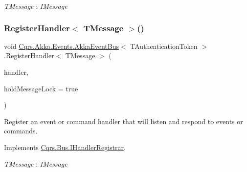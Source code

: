 \begin{Desc}
\item[Type Constraints]\begin{description}
\item[{\em T\+Message} : {\em I\+Message}]\end{description}
\end{Desc}
\mbox{\label{classCqrs_1_1Akka_1_1Events_1_1AkkaEventBus_a6795dfcaf611ce1b50310f442cef0546_a6795dfcaf611ce1b50310f442cef0546}} 
\subsubsection{\texorpdfstring{Register\+Handler$<$ T\+Message $>$()}{RegisterHandler< TMessage >()}\hspace{0.1cm}{\footnotesize\ttfamily [2/2]}}
{\footnotesize\ttfamily void \hyperlink{classCqrs_1_1Akka_1_1Events_1_1AkkaEventBus}{Cqrs.\+Akka.\+Events.\+Akka\+Event\+Bus}$<$ T\+Authentication\+Token $>$.Register\+Handler$<$ T\+Message $>$ (\begin{DoxyParamCaption}\item[{Action$<$ T\+Message $>$}]{handler,  }\item[{bool}]{hold\+Message\+Lock = {\ttfamily true} }\end{DoxyParamCaption})}



Register an event or command handler that will listen and respond to events or commands. 



Implements \hyperlink{interfaceCqrs_1_1Bus_1_1IHandlerRegistrar_a07792dcc9a8b272709ff2e2dd336a642_a07792dcc9a8b272709ff2e2dd336a642}{Cqrs.\+Bus.\+I\+Handler\+Registrar}.

\begin{Desc}
\item[Type Constraints]\begin{description}
\item[{\em T\+Message} : {\em I\+Message}]\end{description}
\end{Desc}


